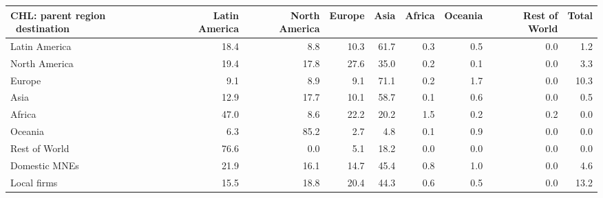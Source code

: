 \begin{tabular}{lrrrrrrrr}
\toprule
CHL: parent region \ destination & Latin America & North America & Europe & Asia & Africa & Oceania & Rest of World & Total \\
\midrule
Latin America & 18.4 & 8.8 & 10.3 & 61.7 & 0.3 & 0.5 & 0.0 & 1.2 \\
North America & 19.4 & 17.8 & 27.6 & 35.0 & 0.2 & 0.1 & 0.0 & 3.3 \\
Europe & 9.1 & 8.9 & 9.1 & 71.1 & 0.2 & 1.7 & 0.0 & 10.3 \\
Asia & 12.9 & 17.7 & 10.1 & 58.7 & 0.1 & 0.6 & 0.0 & 0.5 \\
Africa & 47.0 & 8.6 & 22.2 & 20.2 & 1.5 & 0.2 & 0.2 & 0.0 \\
Oceania & 6.3 & 85.2 & 2.7 & 4.8 & 0.1 & 0.9 & 0.0 & 0.0 \\
Rest of World & 76.6 & 0.0 & 5.1 & 18.2 & 0.0 & 0.0 & 0.0 & 0.0 \\
Domestic MNEs & 21.9 & 16.1 & 14.7 & 45.4 & 0.8 & 1.0 & 0.0 & 4.6 \\
Local firms & 15.5 & 18.8 & 20.4 & 44.3 & 0.6 & 0.5 & 0.0 & 13.2 \\
\bottomrule
\end{tabular}
